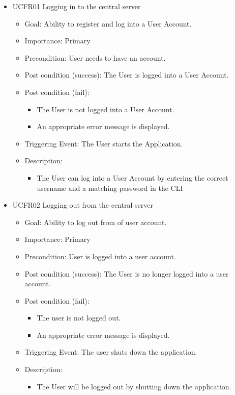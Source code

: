 \begin{itemize}
	\item UCFR01 Logging in to the central server
	\begin{itemize}
		\item Goal: Ability to register and log into a User Account.
		\item Importance: Primary
		\item Precondition: User needs to have an account.
		\item Post condition (success): The User is logged into a User Account.
		\item Post condition (fail):
		\begin{itemize}  
			\item The User is not logged into a User Account.
			\item An appropriate error message is displayed.
		\end{itemize}
		\item Triggering Event: The User starts the Application.
		\item Description:
		\begin{itemize}
			\item   The User can log into a User Account by entering the correct username and a matching password in the CLI
		\end{itemize}
	\end{itemize}
	
	\item UCFR02 Logging out from the central server
	\begin{itemize}
		\item Goal: Ability to log out from of user account.
		\item Importance: Primary
		\item Precondition: User is logged into a user account.
		\item Post condition (success): The User is no longer logged into a user account.
		\item Post condition (fail):
		\begin{itemize}
			\item The user is not logged out.
			\item An appropriate error message is displayed.
		\end{itemize}
		\item Triggering Event: The user shuts down the application.
		\item Description:
		\begin{itemize}
			\item The User will be logged out by shutting down the application.
		\end{itemize}
	\end{itemize}
	

\end{itemize}
